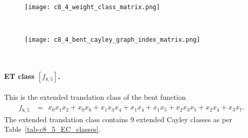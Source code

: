 \documentclass[12pt,a4paper]{article}
\begin{document}
\begin{figure}[!bhpt] %
\centering
\begin{minipage}{.48\textwidth}
  \centering
  \texttt{[image: c8\_4\_weight\_class\_matrix.png]}
  \label{fig:c8_4_weight_class_matrix}
\end{minipage}%
~~~~
\begin{minipage}{.48\textwidth}
  \centering
  \texttt{[image: c8\_4\_bent\_cayley\_graph\_index\_matrix.png]}
  \label{fig:c8_4_bent_cayley_graph_index_matrix}
\end{minipage}
\end{figure}
~
\newpage
\paragraph*{ET class $[f_{8,5}]$.}
%
This is the extended translation class of the bent function
\small{}
\begin{align*}
f_{ 8 , 5 } &=
\begin{array}{l}
x_{0} x_{1} x_{2} + x_{0} x_{6} + x_{1} x_{3} x_{4} + x_{1} x_{4} + x_{1} x_{5} + x_{2} x_{3} x_{5}
+ x_{2} x_{4} + x_{3} x_{7}.
\end{array}
\end{align*}
\normalsize{}
The extended translation class contains 9 extended Cayley classes as per Table~\ref{tab-c8_5_EC_classes}.
\end{document}
